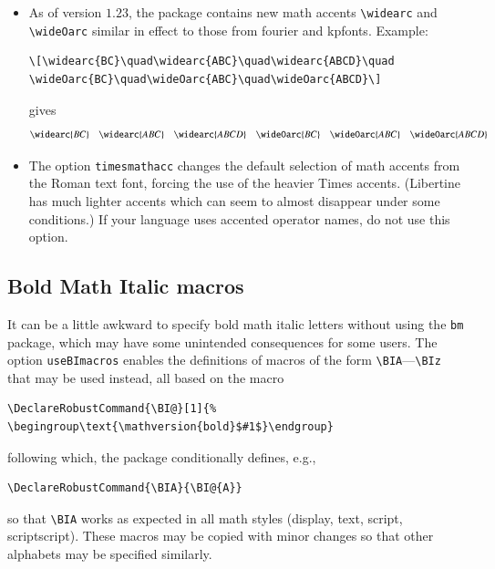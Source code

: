 \documentclass[11pt]{article}
\theoremstyle{oldplain}
\theoremstyle{plain}
\begin{document}
\begin{itemize}
\begin{itemize}
\begin{verbatim}
\[\overgroup{ABC}\quad\overgroupra{ABC}\quad\undergroup{ABC}\quad
\undergroupla{ABC}\quad \widering{ABCD}\] 
\end{verbatim}
gives
\[\overgroup{ABC}\quad\overgroupra{ABC}\quad\undergroup{ABC}\quad\undergroupla{ABC}\quad\widering{ABCD}\] 
\end{itemize}
\item As of version $1.23$, the package contains new math accents \verb|\widearc| and \verb|\wideOarc| similar in effect to those from \textsf{fourier} and \textsf{kpfonts}. Example: 
\begin{verbatim}
\[\widearc{BC}\quad\widearc{ABC}\quad\widearc{ABCD}\quad
\wideOarc{BC}\quad\wideOarc{ABC}\quad\wideOarc{ABCD}\]
\end{verbatim}
gives
\[\widearc{BC}\quad\widearc{ABC}\quad\widearc{ABCD}\quad
\wideOarc{BC}\quad\wideOarc{ABC}\quad\wideOarc{ABCD}\]
\item The option {\tt timesmathacc} changes the default selection of math accents from the Roman text font, forcing the use of the heavier Times accents. (Libertine has much lighter accents which can seem to almost disappear under some conditions.) If your language uses accented operator names, do not use this option.
\end{itemize}
\bigskip

\subsection{Bold Math Italic macros}
It can be a little awkward to specify bold math italic letters without using the \texttt{bm} package, which may have some unintended consequences for some users. The option \texttt{useBImacros} enables the definitions of macros of the form \verb|\BIA|---\verb|\BIz| that may be used instead, all based on the macro 
\begin{verbatim}
\DeclareRobustCommand{\BI@}[1]{%
\begingroup\text{\mathversion{bold}$#1$}\endgroup}
\end{verbatim}
following which, the package conditionally defines, e.g.,
\begin{verbatim}
\DeclareRobustCommand{\BIA}{\BI@{A}}
\end{verbatim}
so that \verb|\BIA| works as expected in all math styles (display, text, script, scriptscript). These macros may be copied with minor changes so that other alphabets may be specified similarly.
\end{document}
